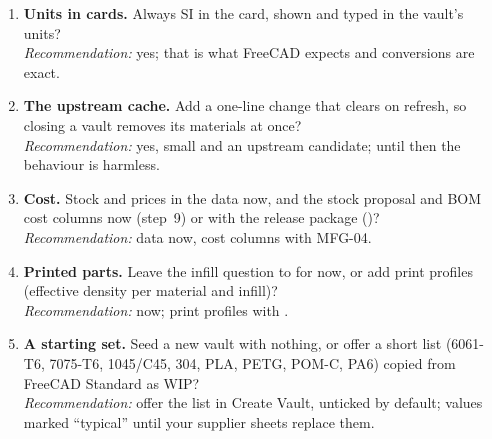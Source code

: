 \begin{enumerate}
        \emph{Recommendation:} : materials belong to the company, not to a program.
  \item \textbf{Units in cards.} Always SI in the card, shown and typed in the vault's units?\\
        \emph{Recommendation:} yes; that is what FreeCAD expects and conversions are exact.
  \item \textbf{The upstream cache.} Add a one-line \code{[BW]} change that clears  on refresh, so
        closing a vault removes its materials at once?\\
        \emph{Recommendation:} yes, small and an upstream candidate; until then the behaviour is harmless.
  \item \textbf{Cost.} Stock and prices in the data now, and the stock proposal and BOM cost columns now (step~9) or with
        the release package ()?\\
        \emph{Recommendation:} data now, cost columns with MFG-04.
  \item \textbf{Printed parts.} Leave the infill question to  for now, or add print profiles (effective
        density per material and infill)?\\
        \emph{Recommendation:}  now; print profiles with .
  \item \textbf{A starting set.} Seed a new vault with nothing, or offer a short list (6061-T6, 7075-T6, 1045/C45, 304,
        PLA, PETG, POM-C, PA6) copied from FreeCAD Standard as WIP?\\
        \emph{Recommendation:} offer the list in Create Vault, unticked by default; values marked ``typical'' until your
        supplier sheets replace them.
\end{enumerate}
